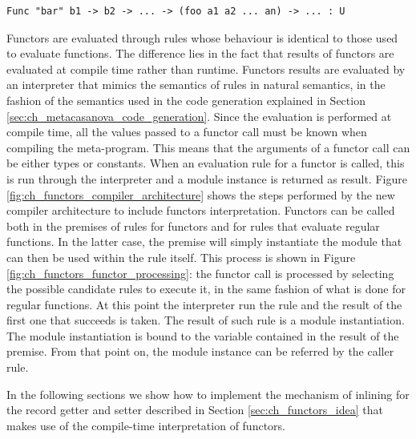 \begin{lstlisting}
Func "bar" b1 -> b2 -> ... -> (foo a1 a2 ... an) -> ... : U
\end{lstlisting}

\noindent
Functors are evaluated through rules whose behaviour is identical to those used to evaluate functions. The difference lies in the fact that results of functors are evaluated at compile time rather than runtime. Functors results are evaluated by an interpreter that mimics the semantics of rules in natural semantics, in the fashion of the semantics used in the code generation explained in Section \ref{sec:ch_metacasanova_code_generation}. Since the evaluation is performed at compile time, all the values passed to a functor call must be known when compiling the meta-program. This means that the arguments of a functor call can be either types or constants. When an evaluation rule for a functor is called, this is run through the interpreter and a module instance is returned as result. Figure \ref{fig:ch_functors_compiler_architecture} shows the steps performed by the new compiler architecture to include functors interpretation. Functors can be called both in the premises of rules for functors and for rules that evaluate regular functions. In the latter case, the premise will simply instantiate the module that can then be used within the rule itself. This process is shown in Figure \ref{fig:ch_functors_functor_processing}: the functor call is processed by selecting the possible candidate rules to execute it, in the same fashion of what is done for regular functions. At this point the interpreter run the rule and the result of the first one that succeeds is taken. The result of such rule is a module instantiation. The module instantiation is bound to the variable contained in the result of the premise. From that point on, the module instance can be referred by the caller rule.

In the following sections we show how to implement the mechanism of inlining for the record getter and setter described in Section \ref{sec:ch_functors_idea} that makes use of the compile-time interpretation of functors.

